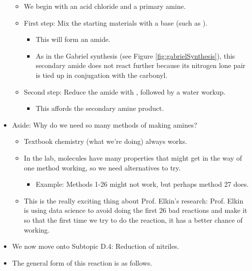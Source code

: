 \documentclass[../notes.tex]{subfiles}
\begin{document}
\begin{itemize}
\begin{figure}[H]
        \label{fig:acylReduce}
    \end{figure}
    \begin{itemize}
        \item We begin with an acid chloride and a primary amine.
        \item First step: Mix the starting materials with a base (such as ).
        \begin{itemize}
            \item This will form an amide.
            \item As in the Gabriel synthesis (see Figure \ref{fig:gabrielSynthesis}), this secondary amide does not react further because its nitrogen lone pair is tied up in conjugation with the carbonyl.
        \end{itemize}
        \item Second step: Reduce the amide with , followed by a water workup.
        \begin{itemize}
            \item This affords the secondary amine product.
        \end{itemize}
    \end{itemize}
    \item Aside: Why do we need so many methods of making amines?
    \begin{itemize}
        \item Textbook chemistry (what we're doing) always works.
        \item In the lab, molecules have many properties that might get in the way of one method working, so we need alternatives to try.
        \begin{itemize}
            \item Example: Methods 1-26 might not work, but perhaps method 27 does.
        \end{itemize}
        \item This is the really exciting thing about Prof. Elkin's research: Prof. Elkin is using data science to avoid doing the first 26 bad reactions and make it so that the first time we try to do the reaction, it has a better chance of working.
    \end{itemize}
    \item We now move onto Subtopic D.4: Reduction of nitriles.
    \item The general form of this reaction is as follows.
    \begin{figure}[h!]
        \centering
        \footnotesize

\end{figure}
\end{itemize}
\end{document}
